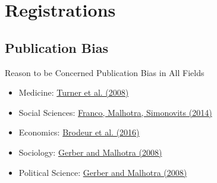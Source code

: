 \documentclass[aspectratio=169]{beamer}
\begin{document}
\section{Registrations}
\subsection{Publication Bias}



\begin{frame}{Reason to be Concerned}
Publication Bias in All Fields
\begin{itemize}[<.->]
\item Medicine: \href{http://www.nejm.org/doi/full/10.1056/nejmsa065779}{Turner et al. (2008)}
\item Social Sciences: \href{http://science.sciencemag.org/content/345/6203/1502.short}{Franco, Malhotra, Simonovits (2014)}
\item Economics: \href{https://www.aeaweb.org/articles.php?doi=10.1257/app.20150044}{Brodeur et al. (2016)}
\item Sociology: \href{http://smr.sagepub.com/content/37/1/3.short}{Gerber and Malhotra (2008)}
\item Political Science: \href{http://nowpublishers.com/article/Details/QJPS-8024}{Gerber and Malhotra (2008)}
\end{itemize}
\end{frame}
\end{document}
